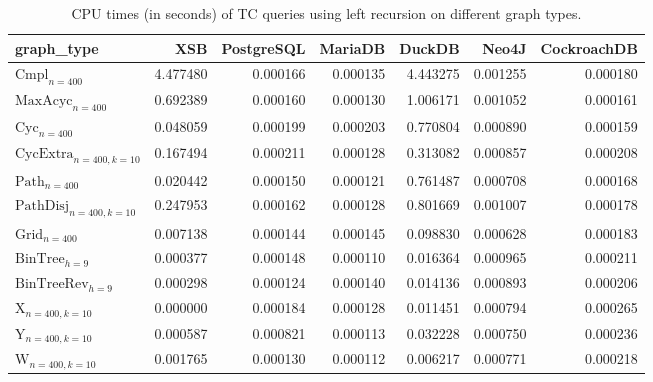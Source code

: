 \begin{table}
\caption{CPU times (in seconds) of TC queries using left recursion on different graph types.}
\label{table:left_recursion_cpu_time}
\begin{tabular}{lrrrrrr}
\toprule
graph\_type & XSB & PostgreSQL & MariaDB & DuckDB & Neo4J & CockroachDB \\
\midrule
$\text{Cmpl}_{n=400}$ & 4.477480 & 0.000166 & 0.000135 & 4.443275 & 0.001255 & 0.000180 \\
$\text{MaxAcyc}_{n=400}$ & 0.692389 & 0.000160 & 0.000130 & 1.006171 & 0.001052 & 0.000161 \\
$\text{Cyc}_{n=400}$ & 0.048059 & 0.000199 & 0.000203 & 0.770804 & 0.000890 & 0.000159 \\
$\text{CycExtra}_{n=400,k=10}$ & 0.167494 & 0.000211 & 0.000128 & 0.313082 & 0.000857 & 0.000208 \\
$\text{Path}_{n=400}$ & 0.020442 & 0.000150 & 0.000121 & 0.761487 & 0.000708 & 0.000168 \\
$\text{PathDisj}_{n=400,k=10}$ & 0.247953 & 0.000162 & 0.000128 & 0.801669 & 0.001007 & 0.000178 \\
$\text{Grid}_{n=400}$ & 0.007138 & 0.000144 & 0.000145 & 0.098830 & 0.000628 & 0.000183 \\
$\text{BinTree}_{h=9}$ & 0.000377 & 0.000148 & 0.000110 & 0.016364 & 0.000965 & 0.000211 \\
$\text{BinTreeRev}_{h=9}$ & 0.000298 & 0.000124 & 0.000140 & 0.014136 & 0.000893 & 0.000206 \\
$\text{X}_{n=400, k=10}$ & 0.000000 & 0.000184 & 0.000128 & 0.011451 & 0.000794 & 0.000265 \\
$\text{Y}_{n=400,k=10}$ & 0.000587 & 0.000821 & 0.000113 & 0.032228 & 0.000750 & 0.000236 \\
$\text{W}_{n=400,k=10}$ & 0.001765 & 0.000130 & 0.000112 & 0.006217 & 0.000771 & 0.000218 \\
\bottomrule
\end{tabular}
\end{table}
